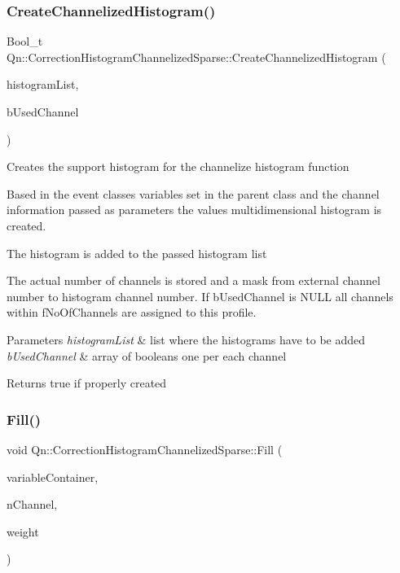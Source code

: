 \subsubsection{\texorpdfstring{Create\+Channelized\+Histogram()}{CreateChannelizedHistogram()}}
{\footnotesize\ttfamily Bool\+\_\+t Qn\+::\+Correction\+Histogram\+Channelized\+Sparse\+::\+Create\+Channelized\+Histogram (\begin{DoxyParamCaption}\item[{T\+List $\ast$}]{histogram\+List,  }\item[{const Bool\+\_\+t $\ast$}]{b\+Used\+Channel }\end{DoxyParamCaption})}

Creates the support histogram for the channelize histogram function

Based in the event classes variables set in the parent class and the channel information passed as parameters the values multidimensional histogram is created.

The histogram is added to the passed histogram list

The actual number of channels is stored and a mask from external channel number to histogram channel number. If b\+Used\+Channel is N\+U\+LL all channels within f\+No\+Of\+Channels are assigned to this profile. 
\begin{DoxyParams}{Parameters}
{\em histogram\+List} & list where the histograms have to be added \\
\hline
{\em b\+Used\+Channel} & array of booleans one per each channel \\
\hline
\end{DoxyParams}
\begin{DoxyReturn}{Returns}
true if properly created 
\end{DoxyReturn}
\mbox{\label{classQn_1_1CorrectionHistogramChannelizedSparse_a11c6c6d5b037fdf9c4f03d2f54e7a526}} 
\subsubsection{\texorpdfstring{Fill()}{Fill()}}
{\footnotesize\ttfamily void Qn\+::\+Correction\+Histogram\+Channelized\+Sparse\+::\+Fill (\begin{DoxyParamCaption}\item[{const double $\ast$}]{variable\+Container,  }\item[{Int\+\_\+t}]{n\+Channel,  }\item[{Float\+\_\+t}]{weight }\end{DoxyParamCaption})\hspace{0.3cm}{\ttfamily [virtual]}}

